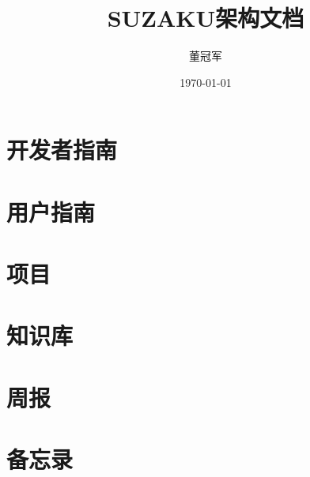 \documentclass[UTF8,oneside]{ctexbook}
\title{SUZAKU架构文档}
\author{董冠军}
\date{\today}
\begin{document}
\maketitle
\tableofcontents

\listoftodos[Notes]

\part{开发者指南}








%

% 
% 
% 

% 
% 

\part{用户指南}

% 
% 
% 

\part{项目}

%
%
%
%

\part{知识库}

%
%
%
%
%

\part{周报}




\part{备忘录}




%
\end{document}
